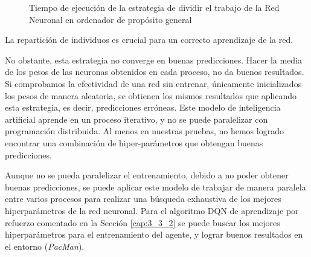			\begin{figure}[!h]
				\centering
				\caption{Tiempo de ejecución de la estrategia de dividir el trabajo de la Red Neuronal en ordenador de propósito general}
				\label{fig:redneu_estrategia2}
			\end{figure}
			

		
			
			La repartición de individuos es crucial para un correcto aprendizaje de la red. 
			
			No obstante, esta estrategia no converge en buenas predicciones. Hacer la media de los pesos de las neuronas obtenidos en cada proceso, no da buenos resultados. Si comprobamos la efectividad de una red sin entrenar, únicamente inicializados los pesos de manera aleatoria, se obtienen los mismos resultados que aplicando esta estrategia, es decir, predicciones erróneas. Este modelo de inteligencia artificial aprende en un proceso iterativo, y no se puede paralelizar con programación distribuida. Al menos en nuestras pruebas, no hemos logrado encontrar una combinación de hiper-parámetros que obtengan buenas predicciones.
			
			
						
			Aunque no se pueda paralelizar el entrenamiento, debido a no poder obtener buenas predicciones, se puede aplicar este modelo de trabajar de manera paralela entre varios procesos para realizar una búsqueda exhaustiva de los mejores hiperparámetros de la red neuronal. Para el algoritmo DQN de aprendizaje por refuerzo comentado en la Sección \ref{cap:3_3_2} se puede buscar los mejores hiperparámetros para el entrenamiento del agente, y lograr buenos resultados en el entorno (\textit{PacMan}). 
			
